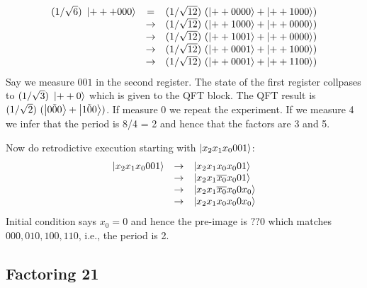 \documentclass{article}
\newcommand{\qket}[1]{\ket{\tilde{#1}}}
\begin{document}
\[\begin{array}{rcl}
(1/\sqrt{6})~\ket{+++000}
  &=& (1/\sqrt{12})~(\ket{++0000} + \ket{++1000}) \\
  &\rightarrow& (1/\sqrt{12})~(\ket{++1000} + \ket{++0000}) \\
  &\rightarrow& (1/\sqrt{12})~(\ket{++1001} + \ket{++0000}) \\
  &\rightarrow& (1/\sqrt{12})~(\ket{++0001} + \ket{++1000}) \\
  &\rightarrow& (1/\sqrt{12})~(\ket{++0001} + \ket{++1100}) 
\end{array}\]
Say we measure $001$ in the second register. The state of the first
register collpases to $(1/\sqrt{3})~\ket{++0}$ which is given to the
QFT block. The QFT result is $(1/\sqrt{2})~(\qket{000} +
\qket{100})$. If measure 0 we repeat the experiment. If we measure 4
we infer that the period is 8/4 = 2 and hence that the factors are 3
and 5.

Now do retrodictive execution starting with $\ket{x_2x_1x_0001}$:
\[\begin{array}{rcl}
\ket{x_2x_1x_0001}
  &\rightarrow& \ket{x_2x_1x_0x_001} \\
  &\rightarrow& \ket{x_2x_1\overline{x_0}x_001} \\
  &\rightarrow& \ket{x_2x_1\overline{x_0}x_00x_0} \\
  &\rightarrow& \ket{x_2x_1x_0x_00x_0} 
\end{array}\]
Initial condition says $x_0 = 0$ and hence the pre-image is $? ? 0$
which matches $000, 010, 100, 110$, i.e., the period is 2.

\subsection{Factoring 21}
\end{document}
